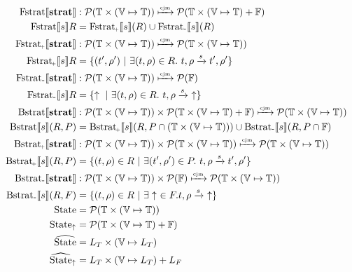 \documentclass{article}
\newcommand{\minus}{{\scalebox{0.9}{-}}}
\newcommand{\plus}{{\scalebox{0.6}{\!+}}}
\newcommand{\fail}{\ensuremath \uparrow}
\newcommand{\transform}[5]{#1, #2 \xrightarrow{#3} #4, #5}
\newcommand{\transformfail}[3]{#1, #2 \xrightarrow{#3}\ \fail}
\newcommand{\cjm}{\ensuremath \xmapsto{\text{\tiny cjm}}}
\newcommand{\Term}{\ensuremath \mathbb{T}}
\newcommand{\Fail}{\ensuremath \mathbb{F}}
\newcommand{\Var}{\ensuremath \mathbb{V}}
\newcommand{\Env}{\ensuremath \Var \mapsto \Term}
\newcommand{\Pow}[1]{\ensuremath \mathcal{P}(#1)}
\newcommand{\Fstrat}[1]{\ensuremath \text{Fstrat}\llbracket #1 \rrbracket}
\newcommand{\Fstratm}[1]{\ensuremath \text{Fstrat}_\minus \llbracket #1 \rrbracket}
\newcommand{\Fstratp}[1]{\ensuremath \text{Fstrat}_\plus \llbracket #1 \rrbracket}
\newcommand{\Bstrat}[1]{\ensuremath \text{Bstrat}\llbracket #1 \rrbracket}
\newcommand{\Bstratp}[1]{\ensuremath \text{Bstrat}_\plus \llbracket #1 \rrbracket}
\newcommand{\Bstratm}[1]{\ensuremath \text{Bstrat}_\minus \llbracket #1 \rrbracket}
\newcommand{\State}{\ensuremath \text{State}}
\newcommand{\Statef}{\ensuremath \text{State}_\fail}
\newcommand{\Statea}{\ensuremath \widehat{\text{State}}}
\newcommand{\Stateaf}{\ensuremath \widehat{\text{State}}_\fail}
\newcommand{\absstate}{\ensuremath \alpha_\sigma }
\newcommand{\constate}{\ensuremath \gamma_\sigma }
\newcommand{\absstatefail}{\ensuremath \alpha_{\sigma\fail} }
\newcommand{\constatefail}{\ensuremath \gamma_{\sigma\fail} }
\begin{document}
\begin{align*}
  \Fstrat{\mathbf{strat}} &: \Pow{\Term \times (\Env)} \cjm \Pow{\Term \times (\Env) + \Fail} \\
  \Fstrat{s}R &= \Fstratp{s}(R) \cup \Fstratm{s}(R) \\
  \Fstratp{\mathbf{strat}} &: \Pow{\Term \times (\Env)} \cjm \Pow{\Term \times (\Env)} \\
  \Fstratp{s}R &= \lbrace (t',\rho')\ |\ \exists (t,\rho) \in R.\ \transform{t}{\rho}{s}{t'}{\rho'} \rbrace \\
  \Fstratm{\mathbf{strat}} &: \Pow{\Term \times (\Env)} \cjm \Pow{\Fail} \\
  \Fstratm{s}R &= \lbrace \fail\ |\ \exists (t,\rho) \in R.\ \transformfail{t}{\rho}{s} \rbrace \\
  \Bstrat{\mathbf{strat}} &: \Pow{\Term \times (\Env)} \times \Pow{\Term \times (\Env) + \Fail} \cjm \Pow{\Term \times (\Env)} \\
  \Bstrat{s}(R,P) &= \Bstratp{s}(R,P \cap (\Term \times (\Env))) \cup \Bstratm{s}(R,P \cap \Fail) \\
  \Bstratp{\mathbf{strat}} &: \Pow{\Term \times (\Env)} \times \Pow{\Term \times (\Env)} \cjm \Pow{\Term \times (\Env)} \\
  \Bstratp{s}(R,P) &= \lbrace (t,\rho) \in R\ |\ \exists (t',\rho') \in P.\ \transform{t}{\rho}{s}{t'}{\rho'} \rbrace \\
  \Bstratm{\mathbf{strat}} &: \Pow{\Term \times (\Env)} \times \Pow{\Fail} \cjm \Pow{\Term \times (\Env)} \\
  \Bstratm{s}(R,F) &= \lbrace (t,\rho) \in R\ |\ \exists \fail\ \in F. \transformfail{t}{\rho}{s} \rbrace \\
  \State &= \Pow{\Term \times (\Env)} \\
  \Statef &= \Pow{\Term \times (\Env) + \Fail} \\
  \Statea &= L_T \times (\Var \mapsto L_T) \\
  \Stateaf &= L_T \times (\Var \mapsto L_T) + L_F
\end{align*}

\begin{center}
\end{center}
\end{document}
